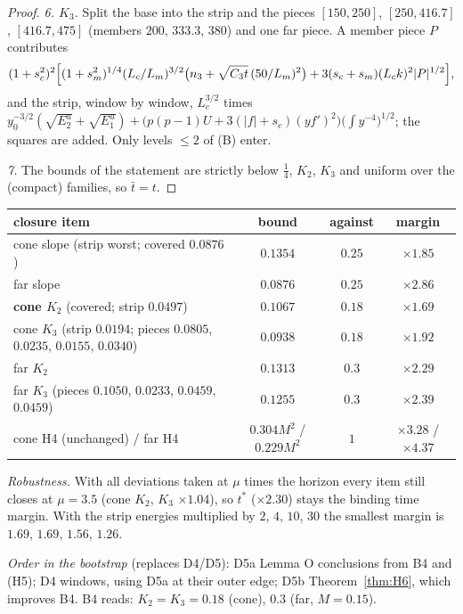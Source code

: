 \documentclass[10pt]{article}
\begin{document}
\begin{proof}
\emph{6. $K_3$.} Split the base into the strip and the pieces $[150,250]$, $[250,416.7]$, $[416.7,475]$ (members $200$, $333.3$, $380$) and one far piece. A member piece $P$ contributes
\[(1+s_c^2)^2\Bigl[(1+s_m^2)^{1/4}(L_c/L_m)^{3/2}\bigl(n_3+\sqrt{C_3t}\,(50/L_m)^2\bigr)+3(s_c+s_m)(L_ck)^2|P|^{1/2}\Bigr],\]
and the strip, window by window, $L_c^{3/2}$ times $y_0^{-3/2}(\sqrt{E^u_2}+\sqrt{E^u_1})+\bigl(p(p-1)U+3(|f|+s_c)(yf')^2\bigr)\bigl(\int y^{-4}\bigr)^{1/2}$; the squares are added. Only levels $\le2$ of (B) enter.

\emph{7.} The bounds of the statement are strictly below $\tfrac14$, $K_2$, $K_3$ and uniform over the (compact) families, so $\bar t=t$.
\end{proof}
\begin{center}\small\begin{tabular}{lccc}\toprule
closure item & bound & against & margin\\\midrule
cone slope (strip worst; covered $0.0876$) & $0.1354$ & $0.25$ & $\times1.85$\\
far slope & $0.0876$ & $0.25$ & $\times2.86$\\
\textbf{cone $K_2$} (covered; strip $0.0497$) & $0.1067$ & $0.18$ & $\mathbf{\times1.69}$\\
cone $K_3$ (strip $0.0194$; pieces $0.0805$, $0.0235$, $0.0155$, $0.0340$) & $0.0938$ & $0.18$ & $\times1.92$\\
far $K_2$ & $0.1313$ & $0.3$ & $\times2.29$\\
far $K_3$ (pieces $0.1050$, $0.0233$, $0.0459$, $0.0459$) & $0.1255$ & $0.3$ & $\times2.39$\\
cone H4 (unchanged) / far H4 & $0.304M^2$ / $0.229M^2$ & $1$ & $\times3.28$ / $\times4.37$\\\bottomrule
\end{tabular}\end{center}
\emph{Robustness.} With all deviations taken at $\mu$ times the horizon every item still closes at $\mu=3.5$ (cone $K_2$, $K_3$ $\times1.04$), so $t^*$ ($\times2.30$) stays the binding time margin. With the strip energies multiplied by $2$, $4$, $10$, $30$ the smallest margin is $1.69$, $1.69$, $1.56$, $1.26$.

\noindent\emph{Order in the bootstrap} (replaces D4/D5): D5a Lemma O conclusions from B4 and (H5); D4 windows, using D5a at their outer edge; D5b Theorem~\ref{thm:H6}, which improves B4. B4 reads: $K_2=K_3=0.18$ (cone), $0.3$ (far, $M=0.15$).
\end{document}
